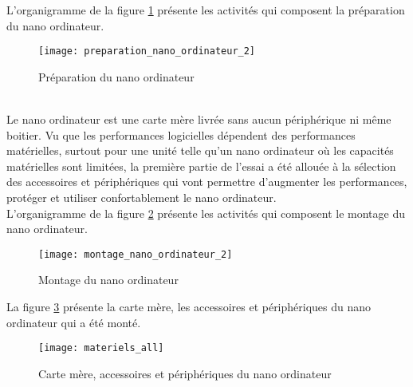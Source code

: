 ﻿L'organigramme de la figure \ref{fig:preparation_nano_ordinateur} présente les activités qui composent la préparation du nano ordinateur. 
\begin{figure}[H]
    \centering
    \texttt{[image: preparation\_nano\_ordinateur\_2]}
    \caption{Préparation du nano ordinateur}
    \label{fig:preparation_nano_ordinateur}
\end{figure}
 \label{montage_nano_ordinateur}
\vspace{\baselineskip}
\\
\noindent Le nano ordinateur est une carte mère livrée sans aucun périphérique ni même boitier. Vu que les performances logicielles dépendent des performances matérielles, surtout pour une unité telle qu'un nano ordinateur où les capacités matérielles sont limitées, la première partie de l'essai a été allouée à la sélection des accessoires et périphériques qui vont permettre d'augmenter les performances, protéger et utiliser confortablement le nano ordinateur. 
\vspace{\baselineskip}
\\
\noindent L'organigramme de la figure \ref{fig:montage_nano_ordinateur} présente les activités qui composent le montage du nano ordinateur. 
\begin{figure}[H]
    \centering
    \texttt{[image: montage\_nano\_ordinateur\_2]}
    \caption{Montage du nano ordinateur}
    \label{fig:montage_nano_ordinateur}
\end{figure}
La figure \ref{fig:materiels_all} présente la carte mère, les accessoires et périphériques du nano ordinateur qui a été monté. 
\begin{figure}[H]
    \centering
    \texttt{[image: materiels\_all]}
    \caption{Carte mère, accessoires et périphériques du nano ordinateur}
    \label{fig:materiels_all}
\end{figure}

